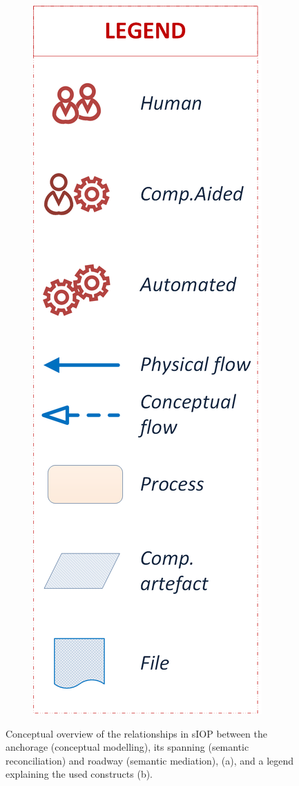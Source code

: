 \documentclass[sort&compress,preprint,authoryear,3p,twocolumn]{elsarticle}
\begin{document}
\begin{figure}
\begin{subfigure}[b]{.15\textwidth}
    \includegraphics[width=\textwidth]{src/images/3ConcernsLegend.png}
    \caption{}
    \label{fig:concernsb}
  \end{subfigure}
  \caption{Conceptual overview of the relationships in sIOP between the anchorage (conceptual modelling), its spanning 
(semantic reconciliation) and roadway (semantic mediation), (a), and a legend explaining the used constructs (b).}
  \label{fig:semantic-concerns}
\end{figure}
\end{document}
